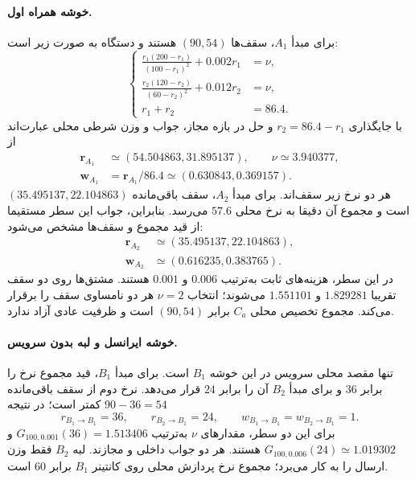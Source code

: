 \paragraph{خوشه همراه اول.}
برای مبدأ $A_1$، سقف‌ها $(90,54)$ هستند و دستگاه به صورت زیر است:
\begin{equation}
\left\{\begin{aligned}
 \frac{r_1(200-r_1)}{(100-r_1)^2}+0.002r_1&=\nu,\\
 \frac{r_2(120-r_2)}{(60-r_2)^2}+0.012r_2&=\nu,\\
 r_1+r_2&=86.4.
\end{aligned}\right.
\end{equation}
با جایگذاری $r_2=86.4-r_1$ و حل در بازه مجاز، جواب و وزن شرطی محلی عبارت‌اند از
\begin{align}
 \boldsymbol r_{A_1}&\simeq(54.504863,31.895137),\qquad \nu\simeq3.940377,\\
 \boldsymbol w_{A_1}&=\boldsymbol r_{A_1}/86.4\simeq(0.630843,0.369157).
\end{align}
هر دو نرخ زیر سقف‌اند. برای مبدأ $A_2$، سقف باقی‌مانده $(35.495137,22.104863)$ است و مجموع آن دقیقا به نرخ محلی $57.6$ می‌رسد. بنابراین، جواب این سطر مستقیما از قید مجموع و سقف‌ها مشخص می‌شود:
\begin{align}
 \boldsymbol r_{A_2}&\simeq(35.495137,22.104863),\\
 \boldsymbol w_{A_2}&\simeq(0.616235,0.383765).
\end{align}
در این سطر، هزینه‌های ثابت به‌ترتیب $0.006$ و $0.001$ هستند. مشتق‌ها روی دو سقف تقریبا $1.829281$ و $1.551101$ می‌شوند؛ انتخاب $\nu=2$ هر دو نامساوی سقف را برقرار می‌کند. مجموع تخصیص محلی $C_a$ برابر $(90,54)$ است و ظرفیت عادی آزاد ندارد.

\paragraph{خوشه ایرانسل و لبه بدون سرویس.}
تنها مقصد محلی سرویس در این خوشه $B_1$ است. برای مبدأ $B_1$، قید مجموع نرخ را برابر $36$ و برای مبدأ $B_2$ آن را برابر $24$ قرار می‌دهد. نرخ دوم از سقف باقی‌مانده $90-36=54$ کمتر است؛ در نتیجه
\begin{equation}
 r_{B_1\rightarrow B_1}=36,\qquad
 r_{B_2\rightarrow B_1}=24,\qquad
 w_{B_1\rightarrow B_1}=w_{B_2\rightarrow B_1}=1.
\end{equation}
برای این دو سطر، مقدارهای $\nu$ به‌ترتیب $G_{100,0.001}(36)=1.513406$ و $G_{100,0.006}(24)\simeq1.019302$ هستند. هر دو جواب داخلی و مجازند. لبه $B_2$ فقط وزن ارسال را به کار می‌برد؛ مجموع نرخ پردازش محلی روی کانتینر $B_1$ برابر $60$ است.

